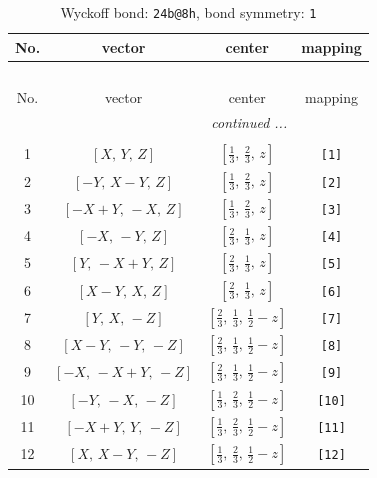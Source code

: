 \documentclass[fleqn,8pt]{jsarticle}
\begin{document}
\begin{longtable}{cccc}
\caption{Wyckoff bond: {\tt 24b@8h}, bond symmetry: {\tt 1}}
 \\
 \hline \hline
No. & vector & center & mapping \\ \hline \endfirsthead

\multicolumn{3}{l}{\tablename\ \thetable{}} \\
 \hline \hline
No. & vector & center & mapping \\ \hline \endhead

 \hline \hline
\multicolumn{3}{r}{\footnotesize\it continued ...} \\ \endfoot

 \hline \hline
\multicolumn{3}{r}{} \\ \endlastfoot

1 & $\left[ X,\, Y,\, Z \right]$ & $\left[ \frac{1}{3},\, \frac{2}{3},\, z \right]$ & {\tt [1]} \\ \hline
2 & $\left[ - Y,\, X - Y,\, Z \right]$ & $\left[ \frac{1}{3},\, \frac{2}{3},\, z \right]$ & {\tt [2]} \\ \hline
3 & $\left[ - X + Y,\, - X,\, Z \right]$ & $\left[ \frac{1}{3},\, \frac{2}{3},\, z \right]$ & {\tt [3]} \\ \hline
4 & $\left[ - X,\, - Y,\, Z \right]$ & $\left[ \frac{2}{3},\, \frac{1}{3},\, z \right]$ & {\tt [4]} \\ \hline
5 & $\left[ Y,\, - X + Y,\, Z \right]$ & $\left[ \frac{2}{3},\, \frac{1}{3},\, z \right]$ & {\tt [5]} \\ \hline
6 & $\left[ X - Y,\, X,\, Z \right]$ & $\left[ \frac{2}{3},\, \frac{1}{3},\, z \right]$ & {\tt [6]} \\ \hline
7 & $\left[ Y,\, X,\, - Z \right]$ & $\left[ \frac{2}{3},\, \frac{1}{3},\, \frac{1}{2} - z \right]$ & {\tt [7]} \\ \hline
8 & $\left[ X - Y,\, - Y,\, - Z \right]$ & $\left[ \frac{2}{3},\, \frac{1}{3},\, \frac{1}{2} - z \right]$ & {\tt [8]} \\ \hline
9 & $\left[ - X,\, - X + Y,\, - Z \right]$ & $\left[ \frac{2}{3},\, \frac{1}{3},\, \frac{1}{2} - z \right]$ & {\tt [9]} \\ \hline
10 & $\left[ - Y,\, - X,\, - Z \right]$ & $\left[ \frac{1}{3},\, \frac{2}{3},\, \frac{1}{2} - z \right]$ & {\tt [10]} \\ \hline
11 & $\left[ - X + Y,\, Y,\, - Z \right]$ & $\left[ \frac{1}{3},\, \frac{2}{3},\, \frac{1}{2} - z \right]$ & {\tt [11]} \\ \hline
12 & $\left[ X,\, X - Y,\, - Z \right]$ & $\left[ \frac{1}{3},\, \frac{2}{3},\, \frac{1}{2} - z \right]$ & {\tt [12]} \\ \hline

\end{longtable}
\end{document}
